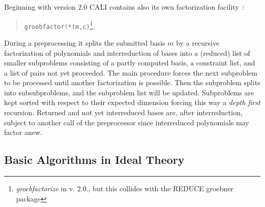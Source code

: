 Beginning with version 2.0 CALI contains also its own \gr
factorization facility~: 
\begin{quote}
\verb|groebfactor!*(m,c)|\footnote{{\em
groebfactorize} in v.  2.0., but this collides with the REDUCE
groebner package}.

\end{quote}
During a preprocessing it splits the submitted basis $m$ by a
recursive factorization of polynomials and interreduction of bases
into a (reduced) list of smaller subproblems consisting of a partly
computed \gr basis, a constraint list, and a list of pairs not yet
proceeded. The main procedure forces the next subproblem to be
processed until another factorization is possible. Then the
subproblem splits into subsubproblems, and the subproblem list will
be updated. Subproblems are kept sorted with respect to their
expected dimension  forcing this way a {\em depth first}
recursion.  Returned and not yet interreduced \gr bases are, after
interreduction, subject to another call of the preprocessor since
interreduced polynomials may factor anew.
\medskip

\subsection{Basic Algorithms in Ideal Theory}

